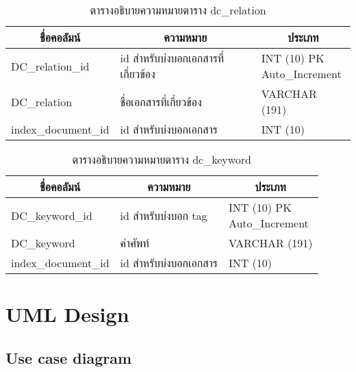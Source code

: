 \begin{table}[H]
\caption{ตารางอธิบายความหมายตาราง dc\_relation}\label{tbl:dcrelation}
\begin{tabular}{|l|l|l|}
\hline
\multicolumn{1}{|c|}{ชื่อคอลัมน์} & \multicolumn{1}{c|}{ความหมาย}      & \multicolumn{1}{c|}{ประเภท}                                                   \\ \hline
DC\_relation\_id                  & id สำหรับบ่งบอกเอกสารที่เกี่ยวข้อง & \makecell[l]{INT   (10) PK\\Auto\_Increment} \\ \hline
DC\_relation                      & ชื่อเอกสารที่เกี่ยวข้อง            & VARCHAR   (191)                                                               \\ \hline
index\_document\_id               & id สำหรับบ่งบอกเอกสาร              & INT (10)                                                                      \\ \hline
\end{tabular}
\end{table}

\begin{table}[H]
\caption{ตารางอธิบายความหมายตาราง dc\_keyword}\label{tbl:dckeyword}
\begin{tabular}{|l|l|l|}
\hline
\multicolumn{1}{|c|}{ชื่อคอลัมน์} & \multicolumn{1}{c|}{ความหมาย}      & \multicolumn{1}{c|}{ประเภท}                                                   \\ \hline
DC\_keyword\_id                   & id สำหรับบ่งบอก tag           & \makecell[l]{INT   (10) PK\\Auto\_Increment} \\ \hline
DC\_keyword                       & คำศัพท์                       & VARCHAR   (191)                                                               \\ \hline
index\_document\_id               & id สำหรับบ่งบอกเอกสาร              & INT (10)                                                                      \\ \hline
\end{tabular}
\end{table}

\section{UML Design}
\subsection{Use case diagram}


